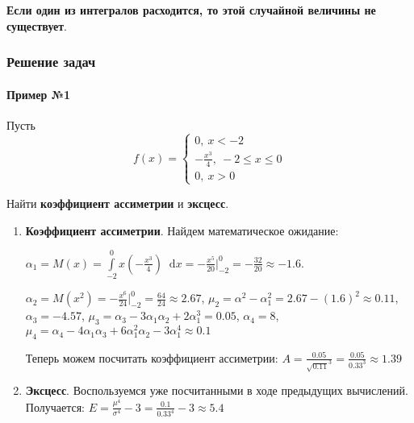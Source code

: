 \documentclass{article}
\newcommand*\diff{\mathop{}\!\mathrm{d}}
\begin{document}
\textbf{Если один из интегралов расходится, то этой случайной величины не существует}.

\subsubsection{Решение задач}

\paragraph{Пример №1}

Пусть $$f(x) = \begin{cases}
    0, \ x < -2 \\
    -\frac{x^{3}}{4}, \ -2 \le x \le 0 \\
    0, \ x > 0
\end{cases}$$

Найти \textbf{коэффициент ассиметрии} и \textbf{эксцесс}.

\begin{enumerate}
    \item \textbf{Коэффициент ассиметрии}. Найдем математическое ожидание:
    
    $\alpha_1 = M(x) = \int\limits_{-2}^{0} x (-\frac{x^3}{4}) \diff x = - \frac{x^5}{20} \bigg|_{-2}^{0} = - \frac{32}{20} \approx - 1.6$. 
    
    $\alpha_2 = M(x^2) = -\frac{x^6}{24} \bigg|_{-2}^{0} = \frac{64}{24} \approx 2.67$, $\mu_2 = \alpha^2 - \alpha_1^2 = 2.67 - (1.6)^2 \approx 0.11$, $\alpha_3 = -4.57$, $\mu_3=\alpha_3 - 3\alpha_1 \alpha_2 + 2 \alpha_1^3 = 0.05$, $\alpha_4 = 8$, $\mu_4 = \alpha_4 - 4\alpha_1 \alpha_3 + 6\alpha_1^2 \alpha_2 - 3\alpha_1^4 \approx 0.1$

    Теперь можем посчитать коэффициент ассиметрии: $A = \frac{0.05}{\sqrt{0.11}^3} = \frac{0.05}{0.33^3} \approx 1.39$
    \item \textbf{Эксцесс}. Воспользуемся уже посчитанными в ходе предыдущих вычислений. Получается: $E = \frac{\mu^{4}}{\sigma^4} - 3 = \frac{0.1}{0.33^4} - 3 \approx 5.4$
\end{enumerate}
\end{document}
